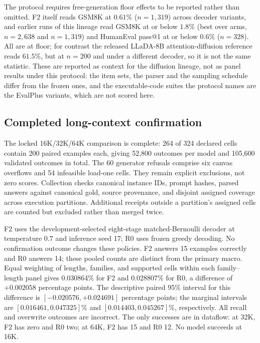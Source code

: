 The protocol requires free-generation floor effects to be reported rather than omitted.
F2 itself reads GSM8K at $0.61\%$ ($n=1{,}319$) across decoder variants, and earlier
runs of this lineage read GSM8K at or below $1.8\%$ (best over arms, $n=2{,}638$ and
$n=1{,}319$) and HumanEval pass@1 at or below $0.6\%$ ($n=328$). All are at floor; for
contrast the released LLaDA-8B attention-diffusion reference reads $61.5\%$, but at
$n=200$ and under a different decoder, so it is not the same statistic. These
are reported as context for the diffusion lineage, not as panel results under this
protocol: the item sets, the parser and the sampling schedule differ from the frozen
ones, and the executable-code suites the protocol names are the EvalPlus variants, which
are not scored here.

\subsection{Completed long-context confirmation}
\label{m:confirmation}

The locked 16K/32K/64K comparison is complete: 264 of 324 declared cells contain 200 paired examples each, giving 52,800 outcomes per model and 105,600 validated outcomes in total. The 60 generator refusals comprise six canvas overflows and 54 infeasible load-one cells. They remain explicit exclusions, not zero scores. Collection checks canonical instance IDs, prompt hashes, parsed answers against canonical gold, source provenance, and disjoint assigned coverage across execution partitions. Additional receipts outside a partition's assigned cells are counted but excluded rather than merged twice.

F2 uses the development-selected eight-stage matched-Bernoulli decoder at temperature $0.7$ and inference seed 17; R0 uses frozen greedy decoding. No confirmation outcome changes these policies. F2 answers 15 examples correctly and R0 answers 14; these pooled counts are distinct from the primary macro. Equal weighting of lengths, families, and supported cells within each family--length panel gives $0.030864\%$ for F2 and $0.028807\%$ for R0, a difference of $+0.002058$ percentage points. The descriptive paired 95\% interval for this difference is $[-0.020576,+0.024691]$ percentage points; the marginal intervals are $[0.016461,0.047325]\%$ and $[0.014403,0.045267]\%$, respectively. All recall and overwrite outcomes are incorrect. The only successes are in dataflow: at 32K, F2 has zero and R0 two; at 64K, F2 has 15 and R0 12. No model succeeds at 16K.

